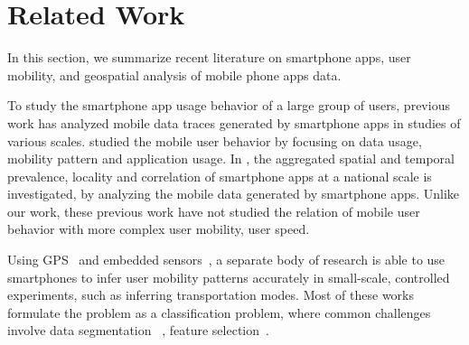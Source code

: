 \section{Related Work}\label{relate}

In this section, we summarize recent literature on smartphone apps, user mobility, and geospatial analysis of mobile phone apps data.



To study the smartphone app usage behavior of a large group of users, previous work has analyzed mobile data traces generated by smartphone apps in studies of various scales. \cite{yang2015characterizing} studied the mobile user behavior by focusing on data usage, mobility pattern and application usage. In \cite{xu2011identifying}, the aggregated spatial and temporal prevalence, locality and correlation of smartphone apps at a national scale is investigated, by analyzing the mobile data generated by smartphone apps. Unlike our work, these previous work have not studied the relation of mobile user behavior with more complex user mobility, \ie user speed.


Using GPS~\cite{6958169, 6450942, zheng2010understanding, biljecki2013transportation, stenneth2011transportation, 5283030, 6460199, Reddy:2010:UMP:1689239.1689243}
and embedded sensors~\cite{6958169, wang2010accelerometer, shin2015urban, manzoni2010transportation, 6038808, Reddy:2010:UMP:1689239.1689243, Hemminki:2013:ATM:2517351.2517367}, a separate body of research is able to use smartphones to infer user mobility patterns accurately in small-scale, controlled experiments, such as inferring transportation modes. Most of these works formulate the problem as a classification problem, where common challenges involve data segmentation ~\cite{6958169, 6450942, zheng2010understanding, biljecki2013transportation}, feature selection~\cite{zheng2010understanding, biljecki2013transportation, wang2010accelerometer, stenneth2011transportation}. 

